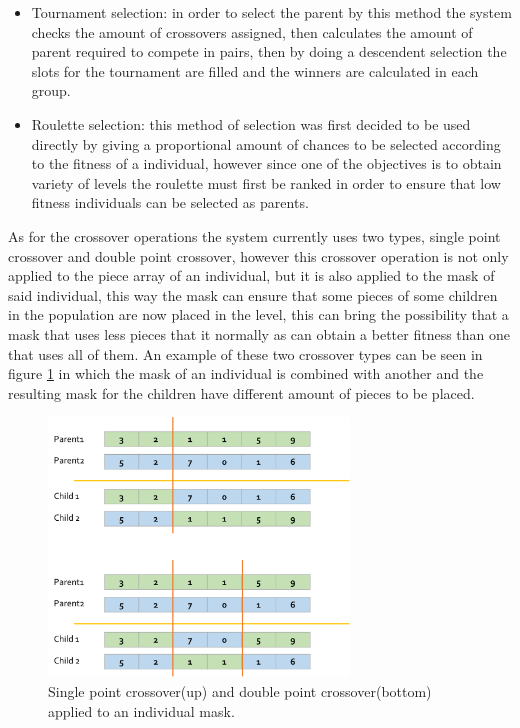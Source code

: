 \documentclass[conference]{IEEEtran}
\begin{document}
    \begin{itemize}
        \item Tournament selection: in order to select the parent by this method the
        system checks the amount of crossovers assigned, then calculates the amount
        of parent required to compete in pairs, then by doing a descendent selection
        the slots for the tournament are filled and the winners are calculated in
        each group.
        \item Roulette selection: this method of selection was first decided to be
        used directly by giving a proportional amount of chances to be selected
        according to the fitness of a individual, however since one of the
        objectives is to obtain variety of levels the roulette must first be ranked
        in order to ensure that low fitness individuals can be selected as parents.
    \end{itemize}
    
    As for the crossover operations the system currently uses two types, single
    point crossover and double point crossover, however this crossover operation is
    not only applied to the piece array of an individual, but it is also applied to
    the mask of said individual, this way the mask can ensure that some pieces of
    some children in the population are now placed in the level, this can bring the
    possibility that a mask that uses less pieces that it normally as can obtain a
    better fitness than one that uses all of them. An example of these two crossover
    types can be seen in figure \ref{crossover} in which the mask of an individual
    is combined with another and the resulting mask for the children have different
    amount of pieces to be placed.
    
    \begin{figure}[htbp]
        \centerline{\includegraphics[width=80mm]{Images/crossover.png}}
        \caption{Single point crossover(up) and double point crossover(bottom) applied to an individual mask.}
        \label{crossover}
    \end{figure}
    
\end{document}
